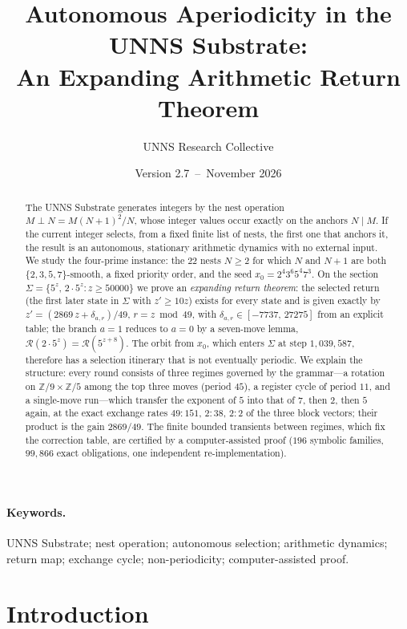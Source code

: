 \documentclass[11pt,a4paper]{article}
\title{Autonomous Aperiodicity in the UNNS Substrate:\\ An Expanding Arithmetic Return Theorem}
\author{UNNS Research Collective}
\date{Version 2.7 \,--\, November 2026}
\theoremstyle{definition}
\newcommand{\nest}{\mathbin{\perp}}
\newcommand{\Ret}{\mathcal{R}}
\begin{document}
\maketitle

\begin{abstract}
\noindent
The UNNS Substrate generates integers by the nest operation $M\nest N=M(N+1)^2/N$, whose integer values occur exactly on the anchors $N\mid M$. If the current integer selects, from a fixed finite list of nests, the first one that anchors it, the result is an autonomous, stationary arithmetic dynamics with no external input. We study the four-prime instance: the $22$ nests $N\ge 2$ for which $N$ and $N+1$ are both $\{2,3,5,7\}$-smooth, a fixed priority order, and the seed $x_0=2^4 3^6 5^4 7^3$. On the section $\Sigma=\{5^z,\,2\cdot5^z: z\ge 50000\}$ we prove an \emph{expanding return theorem}: the selected return (the first later state in $\Sigma$ with $z'\ge 10z$) exists for every state and is given exactly by $z'=(2869\,z+\delta_{a,r})/49$, $r=z\bmod 49$, with $\delta_{a,r}\in[-7737,\,27275]$ from an explicit table; the branch $a=1$ reduces to $a=0$ by a seven-move lemma, $\Ret(2\cdot5^z)=\Ret(5^{z+8})$. The orbit from $x_0$, which enters $\Sigma$ at step $1{,}039{,}587$, therefore has a selection itinerary that is not eventually periodic. We explain the structure: every round consists of three regimes governed by the grammar---a rotation on $\mathbb{Z}/9\times\mathbb{Z}/5$ among the top three moves (period $45$), a register cycle of period $11$, and a single-move run---which transfer the exponent of $5$ into that of $7$, then $2$, then $5$ again, at the exact exchange rates $49\!:\!151$, $2\!:\!38$, $2\!:\!2$ of the three block vectors; their product is the gain $2869/49$. The finite bounded transients between regimes, which fix the correction table, are certified by a computer-assisted proof ($196$ symbolic families, $99{,}866$ exact obligations, one independent re-implementation).
\end{abstract}

\paragraph{Keywords.} UNNS Substrate; nest operation; autonomous selection; arithmetic dynamics; return map; exchange cycle; non-periodicity; computer-assisted proof.

\section{Introduction}\label{sec:intro}
\end{document}
